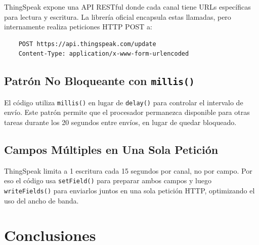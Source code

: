 \documentclass[12pt,a4paper]{article}
\begin{document}
ThingSpeak expone una API RESTful donde cada canal tiene URLs específicas para lectura y escritura. La librería oficial encapsula estas llamadas, pero internamente realiza peticiones HTTP POST a:
\begin{verbatim}
    POST https://api.thingspeak.com/update
    Content-Type: application/x-www-form-urlencoded
\end{verbatim}

\subsection{Patrón No Bloqueante con \texttt{millis()}}

El código utiliza \texttt{millis()} en lugar de \texttt{delay()} para controlar el intervalo de envío. Este patrón permite que el procesador permanezca disponible para otras tareas durante los 20 segundos entre envíos, en lugar de quedar bloqueado.

\subsection{Campos Múltiples en Una Sola Petición}

ThingSpeak limita a 1 escritura cada 15 segundos por canal, no por campo. Por eso el código usa \texttt{setField()} para preparar ambos campos y luego \texttt{writeFields()} para enviarlos juntos en una sola petición HTTP, optimizando el uso del ancho de banda.

\section{Conclusiones}
\end{document}
